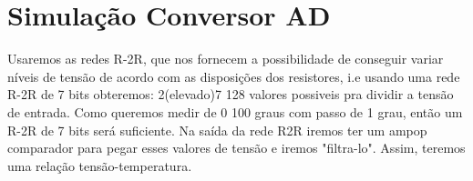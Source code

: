 \documentclass{article}
\begin{document}
\section{Simulação Conversor AD}
Usaremos as redes R-2R, que nos fornecem a possibilidade de conseguir variar níveis de tensão de acordo com as disposições dos resistores, i.e usando uma rede R-2R de 7 bits obteremos: 2(elevado)7 128 valores possiveis pra dividir a tensão de entrada. Como queremos medir de 0 100 graus com passo de 1 grau, então um R-2R de 7 bits será suficiente. Na saída da rede R2R iremos ter um ampop comparador para pegar esses valores de tensão e iremos "filtra-lo". Assim, teremos uma relação tensão-temperatura.
\end{document}
